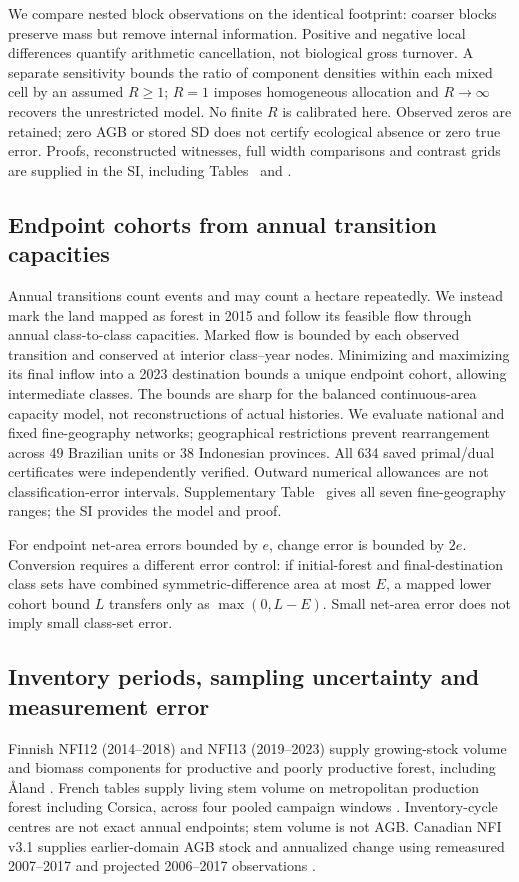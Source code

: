 \documentclass[11pt,a4paper]{article}
\begin{document}
We compare nested block observations on the identical footprint: coarser blocks preserve mass but remove internal information. Positive and negative local differences quantify arithmetic cancellation, not biological gross turnover. A separate sensitivity bounds the ratio of component densities within each mixed cell by an assumed $R\ge1$; $R=1$ imposes homogeneous allocation and $R\to\infty$ recovers the unrestricted model. No finite $R$ is calibrated here. Observed zeros are retained; zero AGB or stored SD does not certify ecological absence or zero true error. Proofs, reconstructed witnesses, full width comparisons and contrast grids are supplied in the SI, including Tables~ and .

\subsection{Endpoint cohorts from annual transition capacities}
Annual transitions count events and may count a hectare repeatedly. We instead mark the land mapped as forest in 2015 and follow its feasible flow through annual class-to-class capacities. Marked flow is bounded by each observed transition and conserved at interior class--year nodes. Minimizing and maximizing its final inflow into a 2023 destination bounds a unique endpoint cohort, allowing intermediate classes. The bounds are sharp for the balanced continuous-area capacity model, not reconstructions of actual histories. We evaluate national and fixed fine-geography networks; geographical restrictions prevent rearrangement across 49 Brazilian units or 38 Indonesian provinces. All 634 saved primal/dual certificates were independently verified. Outward numerical allowances are not classification-error intervals. Supplementary Table~ gives all seven fine-geography ranges; the SI provides the model and proof.

For endpoint net-area errors bounded by $e$, change error is bounded by $2e$. Conversion requires a different error control: if initial-forest and final-destination class sets have combined symmetric-difference area at most $E$, a mapped lower cohort bound $L$ transfers only as $\max(0,L-E)$. Small net-area error does not imply small class-set error.

\subsection{Inventory periods, sampling uncertainty and measurement error}
Finnish NFI12 (2014--2018) and NFI13 (2019--2023) supply growing-stock volume and biomass components for productive and poorly productive forest, including \AA land \citep{Korhonen2021,Korhonen2024}. French tables supply living stem volume on metropolitan production forest including Corsica, across four pooled campaign windows \citep{IGN2018,IGN2026}. Inventory-cycle centres are not exact annual endpoints; stem volume is not AGB. Canadian NFI v3.1 supplies earlier-domain AGB stock and annualized change using remeasured 2007--2017 and projected 2006--2017 observations \citep{CanadaNFI2025}.
\end{document}
